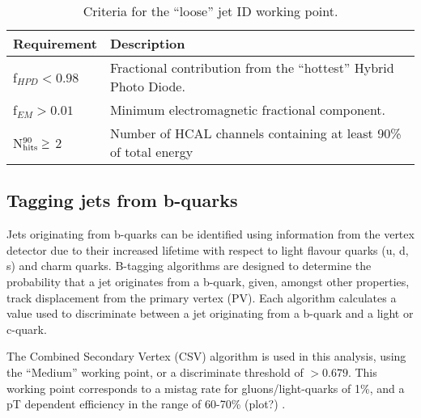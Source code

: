 \begin{table}[!ht]
  \caption{Criteria for the ``loose'' jet ID working point.\label{tab:jet_id_loose}}
  \footnotesize
  \begin{center}
    \begin{tabular}{ll}
      \hline
      \hline
      Requirement                & Description                                                      \\
      \hline
      f$_{HPD} < 0.98$           & Fractional contribution from the ``hottest'' Hybrid Photo Diode. \\
      f$_{EM} > 0.01$            & Minimum electromagnetic fractional component.                    \\
      N$^{90}_{\rm hits} \geq$ 2 & Number of HCAL channels containing at least
      90\% of total energy      \\
      \hline
      \hline
    \end{tabular}
  \end{center}
\end{table}


\subsection{Tagging jets from b-quarks}

Jets originating from b-quarks can be identified using information from the 
vertex detector due to their increased lifetime with respect to light
flavour quarks (u, d, s) and charm quarks. 
B-tagging algorithms are designed to determine the probability that a jet 
originates from a b-quark, given, amongst other properties, track
displacement from the primary vertex (PV). Each algorithm
calculates a value used to discriminate between a jet originating from a
b-quark and a light or c-quark.

The Combined Secondary Vertex (CSV) algorithm \cite{CMS-PAS-BTV-12-001} is used
in this analysis, using the ``Medium'' working point, or a discriminate
threshold of $>0.679$. This working point corresponds to a mistag rate for gluons/light-quarks of 1\%, and a pT dependent efficiency in the range of 60-70\% (plot?)
\cite{CMS-PAS-BTV-12-001}.


